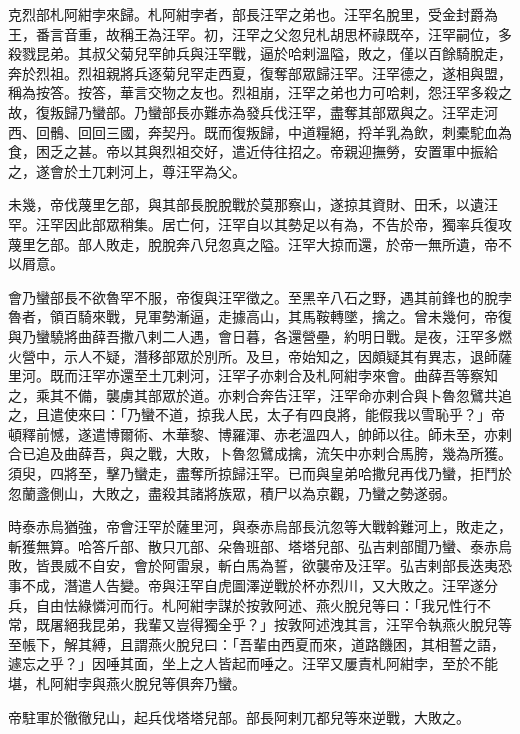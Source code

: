 \begin{pinyinscope}
 克烈部札阿紺孛來歸。札阿紺孛者，部長汪罕之弟也。汪罕名脫里，受金封爵為王，番言音重，故稱王為汪罕。初，汪罕之父忽兒札胡思杯祿既卒，汪罕嗣位，多殺戮昆弟。其叔父菊兒罕帥兵與汪罕戰，逼於哈剌溫隘，敗之，僅以百餘騎脫走，奔於烈祖。烈祖親將兵逐菊兒罕走西夏，復奪部眾歸汪罕。汪罕德之，遂相與盟，稱為按答。按答，華言交物之友也。烈祖崩，汪罕之弟也力可哈剌，怨汪罕多殺之故，復叛歸乃蠻部。乃蠻部長亦難赤為發兵伐汪罕，盡奪其部眾與之。汪罕走河西、回鶻、回回三國，奔契丹。既而復叛歸，中道糧絕，捋羊乳為飲，刺橐駝血為食，困乏之甚。帝以其與烈祖交好，遣近侍往招之。帝親迎撫勞，安置軍中振給之，遂會於土兀剌河上，尊汪罕為父。



 未幾，帝伐蔑里乞部，與其部長脫脫戰於莫那察山，遂掠其資財、田禾，以遺汪罕。汪罕因此部眾稍集。居亡何，汪罕自以其勢足以有為，不告於帝，獨率兵復攻蔑里乞部。部人敗走，脫脫奔八兒忽真之隘。汪罕大掠而還，於帝一無所遺，帝不以屑意。



 會乃蠻部長不欲魯罕不服，帝復與汪罕徵之。至黑辛八石之野，遇其前鋒也的脫孛魯者，領百騎來戰，見軍勢漸逼，走據高山，其馬鞍轉墜，擒之。曾未幾何，帝復與乃蠻驍將曲薛吾撒八剌二人遇，會日暮，各還營壘，約明日戰。是夜，汪罕多燃火營中，示人不疑，潛移部眾於別所。及旦，帝始知之，因頗疑其有異志，退師薩里河。既而汪罕亦還至土兀剌河，汪罕子亦剌合及札阿紺孛來會。曲薛吾等察知之，乘其不備，襲虜其部眾於道。亦剌合奔告汪罕，汪罕命亦剌合與卜魯忽鷿共追之，且遣使來曰：「乃蠻不道，掠我人民，太子有四良將，能假我以雪恥乎？」帝頓釋前憾，遂遣博爾術、木華黎、博羅渾、赤老溫四人，帥師以往。師未至，亦剌合已追及曲薛吾，與之戰，大敗，卜魯忽鷿成擒，流矢中亦剌合馬胯，幾為所獲。須臾，四將至，擊乃蠻走，盡奪所掠歸汪罕。已而與皇弟哈撒兒再伐乃蠻，拒鬥於忽蘭盞側山，大敗之，盡殺其諸將族眾，積尸以為京觀，乃蠻之勢遂弱。



 時泰赤烏猶強，帝會汪罕於薩里河，與泰赤烏部長沆忽等大戰斡難河上，敗走之，斬獲無算。哈答斤部、散只兀部、朵魯班部、塔塔兒部、弘吉剌部聞乃蠻、泰赤烏敗，皆畏威不自安，會於阿雷泉，斬白馬為誓，欲襲帝及汪罕。弘吉剌部長迭夷恐事不成，潛遣人告變。帝與汪罕自虎圖澤逆戰於杯亦烈川，又大敗之。汪罕遂分兵，自由怯綠憐河而行。札阿紺孛謀於按敦阿述、燕火脫兒等曰：「我兄性行不常，既屠絕我昆弟，我輩又豈得獨全乎？」按敦阿述洩其言，汪罕令執燕火脫兒等至帳下，解其縛，且謂燕火脫兒曰：「吾輩由西夏而來，道路饑困，其相誓之語，遽忘之乎？」因唾其面，坐上之人皆起而唾之。汪罕又屢責札阿紺孛，至於不能堪，札阿紺孛與燕火脫兒等俱奔乃蠻。



 帝駐軍於徹徹兒山，起兵伐塔塔兒部。部長阿剌兀都兒等來逆戰，大敗之。




\end{pinyinscope}
